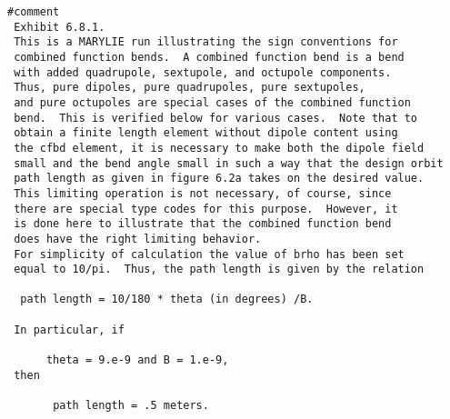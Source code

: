 \begin{footnotesize}
\begin{verbatim}
#comment
 Exhibit 6.8.1.
 This is a MARYLIE run illustrating the sign conventions for
 combined function bends.  A combined function bend is a bend
 with added quadrupole, sextupole, and octupole components.
 Thus, pure dipoles, pure quadrupoles, pure sextupoles,
 and pure octupoles are special cases of the combined function
 bend.  This is verified below for various cases.  Note that to
 obtain a finite length element without dipole content using
 the cfbd element, it is necessary to make both the dipole field
 small and the bend angle small in such a way that the design orbit
 path length as given in figure 6.2a takes on the desired value.
 This limiting operation is not necessary, of course, since
 there are special type codes for this purpose.  However, it
 is done here to illustrate that the combined function bend
 does have the right limiting behavior.
 For simplicity of calculation the value of brho has been set
 equal to 10/pi.  Thus, the path length is given by the relation

  path length = 10/180 * theta (in degrees) /B.

 In particular, if

      theta = 9.e-9 and B = 1.e-9,
 then

       path length = .5 meters.


\end{verbatim}
\end{footnotesize}

